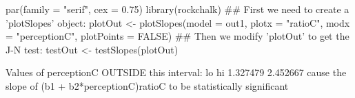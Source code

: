 \begin{Schunk}
\begin{Sinput}
 par(family = "serif", cex = 0.75)
 library(rockchalk)
 ## First we need to create a 'plotSlopes' object:
 plotOut <- plotSlopes(model = out1,
                       plotx = "ratioC",
                       modx = "perceptionC",
                       plotPoints = FALSE)
 ## Then we modify 'plotOut' to get the J-N test:
 testOut <- testSlopes(plotOut)
\end{Sinput}
\begin{Soutput}
Values of perceptionC OUTSIDE this interval:
      lo       hi 
1.327479 2.452667 
cause the slope of (b1 + b2*perceptionC)ratioC to be statistically significant
\end{Soutput}
\end{Schunk}

